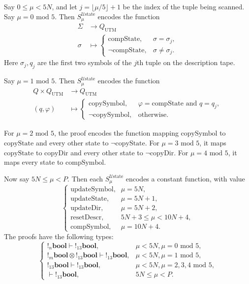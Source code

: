 \documentclass[english,letter paper,12pt,reqno]{article}
\theoremstyle{definition}
\newcommand{\lto}{\longrightarrow}
\begin{document}
Say $0 \leq \mu < 5N$, and let $j = \lfloor \mu/5 \rfloor + 1$ be the index of the tuple being scanned. Say $\mu = 0\text{ mod }5$. Then $S^{\mathcal{U}\text{state}}_\mu$ encodes the function
\begin{align*}
    \Sigma &\lto Q_{\text{UTM}}\\
    \sigma &\longmapsto
    \begin{cases}
        \text{compState}, & \sigma = \sigma_j,\\
        \neg\text{compState}, & \sigma \neq \sigma_j.
    \end{cases}
\end{align*}
Here $\sigma_j,q_j$ are the first two symbols of the $j$th tuple on the description tape.

Say $\mu = 1\text{ mod }5$. Then $S^{\mathcal{U}\text{state}}_\mu$ encodes the function
\begin{align*}
    Q \times Q_{\text{UTM}} &\lto Q_{\text{UTM}}\\
    (q,\varphi) &\longmapsto
    \begin{cases}
        \text{copySymbol}, & \varphi = \text{compState} \text{ and } q = q_j,\\
        \neg\text{copySymbol}, & \text{otherwise}.
    \end{cases}
\end{align*}

For $\mu = 2\text{ mod }5$, the proof encodes the function mapping $\text{copySymbol}$ to $\text{copyState}$ and every other state to $\neg\text{copyState}$. For $\mu = 3\text{ mod }5$, it maps $\text{copyState}$ to $\text{copyDir}$ and every other state to $\neg\text{copyDir}$. For $\mu = 4\text{ mod }5$, it maps every state to $\text{compSymbol}$.

Now say $5N \leq \mu < P$. Then each $S^{\mathcal{U}\text{state}}_\mu$ encodes a constant function, with value
\[
    \begin{cases}
        \text{updateSymbol}, & \mu = 5N,\\
        \text{updateState}, & \mu = 5N+1,\\
        \text{updateDir}, & \mu = 5N+2,\\
        \text{resetDescr}, & 5N+3 \leq \mu < 10N+4,\\
        \text{compSymbol}, & \mu = 10N+4.
    \end{cases}
\]
The proofs have the following types:
\begin{equation}
    \begin{cases}
        {!}{}_{n}\textbf{bool} \vdash {!}{}_{13}\textbf{bool},& \mu < 5N, \mu = 0\text{ mod }5,\\
        {!}{}_{m}\textbf{bool} \otimes {!}{}_{13}\textbf{bool} \vdash {!}{}_{13}\textbf{bool},& \mu < 5N, \mu = 1\text{ mod }5,\\
        {!}{}_{13}\textbf{bool} \vdash {!}{}_{13}\textbf{bool}, & \mu < 5N, \mu = 2,3,4\text{ mod }5,\\
        \vdash {!}{}_{13}\textbf{bool},& 5N \leq \mu < P.
    \end{cases}
\end{equation}
\end{document}
